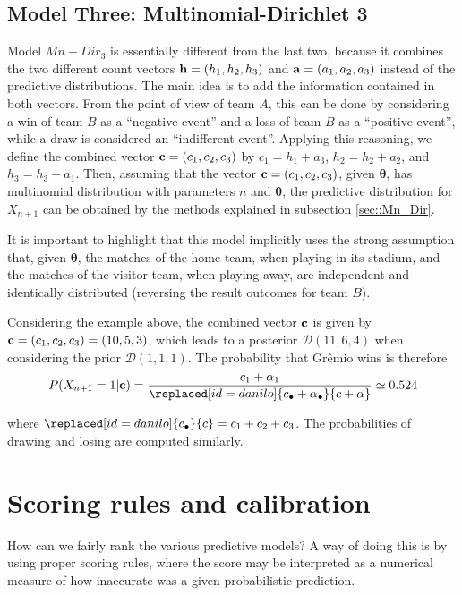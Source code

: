 \documentclass[journal,article,accept,moreauthors,pdftex,12pt,a4paper]{mdpi}
\begin{document}
	\subsection{Model Three: Multinomial-Dirichlet 3}
	\label{sec::Mn_Dir3}
	
	Model $Mn-Dir_3$ is essentially different from the
	last two, because it combines the two different count vectors ${\bf
		h} = (h_1, h_2, h_3)$ and ${\bf a} = (a_1, a_2, a_3)$ instead of the
	predictive distributions. The main idea is to add the information
	contained in both vectors. From the point of view of team $A$, this can
	be done by considering a win of team $B$ as a ``negative event'' and a
	loss of team $B$ as a ``positive event'', while a draw is
	considered an ``indifferent event''. Applying this reasoning,
	we define the combined vector ${\bf c} = (c_1, c_2, c_3)$ by $c_1 =
	h_1 + a_3$, $h_2 = h_2 + a_2$, and $h_3 = h_3 + a_1$. Then, assuming that the vector ${\bf c} = (c_1, c_2, c_3)$, given $\boldsymbol{\theta}$, has multinomial distribution with parameters $n$ and
	$\boldsymbol{\theta}$, the predictive distribution for $X_{n + 1}$ can
	be obtained by the methods explained in subsection
	\ref{sec::Mn_Dir}.
	
	It is important to highlight that this model implicitly uses the strong assumption that, given $\boldsymbol{\theta}$, the matches of the home team, when playing in its stadium, and the matches of the visitor team, when playing away, are independent and identically distributed (reversing the result outcomes for team $B$).
	
	Considering the example above, the combined vector ${\bf c}$ is given by ${\bf c}=(c_1,c_2,c_3)=(10,5,3)$, which leads to a posterior $\mathcal{D}(11,6,4)$ when considering the prior $\mathcal{D}(1,1,1)$.
	The probability that Gr\^emio wins is therefore	
	\[P(X_{n+1}=1|{\bf c})=\frac{c_1+\alpha_1}{\replaced[id=danilo]{c_{\bullet}+\alpha_{\bullet}}{c+\alpha}}\simeq0.524
	\]
	
	\noindent
	where $\replaced[id=danilo]{c_{\bullet}}{c}=c_1+c_2+c_3$. The probabilities of drawing and losing are computed similarly.
	
	\section{Scoring rules and calibration}
	\label{sec::scoring}
	
	How can we fairly rank the various predictive models?
	A way of doing this is by using proper scoring rules, where
	the score may be interpreted as a numerical measure of how inaccurate was a given probabilistic prediction.
	
\end{document}
